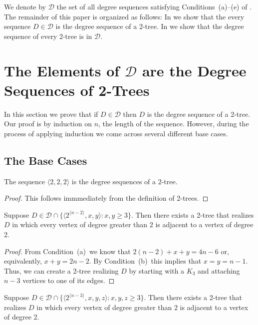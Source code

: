 \documentclass[lotsofwhite,charterfonts]{patmorin}
\newcommand{\rep}[1]{^{\langle#1\rangle}}
\newcommand{\degreesum}{Condition~(a)}
\newcommand{\maxdegree}{Condition~(b)}
\begin{document}
We denote by $\mathcal{D}$ the set of all degree sequences satisfying
Conditions~(a)--(e) of .  The remainder of this paper is
organized as follows:  In  we show that the every sequence
$D\in \mathcal{D}$ is the degree sequence of a 2-tree.  In
 we show that the degree sequence of every 2-tree is
in $\mathcal{D}$.

\section{The Elements of $\mathcal{D}$ are the Degree Sequences of
	2-Trees}

In this section we prove that if $D\in \mathcal{D}$ then $D$ is the
degree sequence of a 2-tree.  Our proof is by induction on $n$, the
length of the sequence.  However, during the process of applying
induction we come across several different base cases.

\subsection{The Base Cases}

\begin{lem}
The sequence $\langle 2,2,2\rangle$ is the degree sequences of a 2-tree.
\end{lem}

\begin{proof}
This follows immmediately from the definition of 2-trees.
\end{proof}


\begin{lem}
Suppose $D\in \mathcal{D}\cap \{\langle 2\rep{n-2},x,y\rangle:
x,y\ge 3\}$. 
Then there exists a 2-tree that realizes $D$ in which every vertex of
degree greater than $2$ is adjacent to a vertex of degree 2.
\end{lem}

\begin{proof}
From \degreesum\ we know that $2(n-2)+x+y=4n-6$ or, equivalently,
$x+y=2n-2$.  By \maxdegree\ this implies that $x=y=n-1$.  Thus,
we can create a 2-tree realizing $D$ by starting with a $K_3$ and
attaching $n-3$ vertices to one of its edges.
\end{proof}

\begin{lem}
Suppose $D\in \mathcal{D}\cap \{\langle 2\rep{n-3},x,y,z\rangle:
x,y,z\ge 3\}$. 
Then there exists a 2-tree that realizes $D$ in which every vertex of
degree greater than $2$ is adjacent to a vertex of degree 2.
\end{lem}
\end{document}
